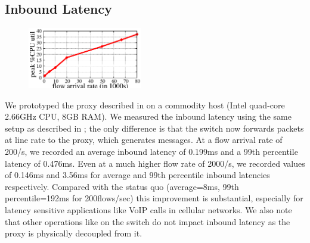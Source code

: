 \subsection{Inbound Latency}
\label{s:eval_inbound}

\begin{figure}[!tb]
\centering
\includegraphics[width=50mm,scale=0.5]{./figs/proxyCPU.eps}
\vspace{0.1em}
\label{peakCPU}
\end{figure}

We prototyped the proxy described in  on a commodity host
(Intel quad-core 2.66GHz CPU, 8GB RAM). We measured the inbound latency
using the same setup as described in ; the only
difference is that the switch now forwards packets at line rate to the proxy,
which generates \packetin messages. At a flow arrival rate of 200/s, we
recorded an average inbound latency of 0.199ms and a 99th percentile latency
of 0.476ms. Even at a much higher flow rate of 2000/s, we recorded values of
0.146ms and 3.56ms for average and 99th percentile inbound latencies
respectively.  Compared with the status quo (average=8ms, 99th percentile=192ms for 200flows/sec) this improvement is substantial, 
especially for latency sensitive applications like VoIP calls in cellular networks. We also note that other operations like \flowmod on the switch do not impact inbound latency as the proxy is physically decoupled from it.


